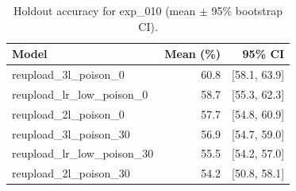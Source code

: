 \begin{table}[ht]
\centering
\caption{Holdout accuracy for exp_010 (mean $\pm$ 95\% bootstrap CI).}
\label{tab:exp_010}
\begin{tabular}{lrr}
\toprule
Model & Mean (\%) & 95\% CI \\
\midrule
reupload\_3l\_poison\_0 & 60.8 & [58.1, 63.9] \\
reupload\_lr\_low\_poison\_0 & 58.7 & [55.3, 62.3] \\
reupload\_2l\_poison\_0 & 57.7 & [54.8, 60.9] \\
reupload\_3l\_poison\_30 & 56.9 & [54.7, 59.0] \\
reupload\_lr\_low\_poison\_30 & 55.5 & [54.2, 57.0] \\
reupload\_2l\_poison\_30 & 54.2 & [50.8, 58.1] \\
\bottomrule
\end{tabular}
\end{table}
